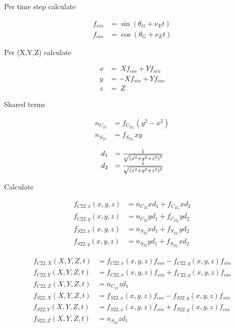 \documentclass{article}
\begin{document}
Per time step calculate

\begin{equation}
\begin{array}{ll}
f_{sin} &= \sin(\theta_G+\nu_Et) \\
f_{cos} &= \cos(\theta_G+\nu_Et)
\end{array}
\end{equation}

Per (X,Y,Z) calculate

\begin{equation}
\begin{array}{ll}
x&=~Xf_{cos}+Yf_{sin} \\
y&=-Xf_{sin}+Yf_{cos} \\
z&=~Z
\end{array}
\end{equation}

Shared terms

\begin{equation}
\begin{array}{ll}
n_{C_{22}} &= f_{C_{22_1}}(y^2-x^2) \\
n_{S_{22}} &= f_{S_{22_1}}xy
\end{array}
\end{equation}

\begin{equation}
\begin{array}{ll}
d_1 &= {1 \over \sqrt{(x^2+y^2+z^2)^7}} \\
d_2 &= {1 \over \sqrt{(x^2+y^2+z^2)^5}}
\end{array}
\end{equation}

Calculate

\begin{equation}
\begin{array}{ll}
f_{C22,x}(x,y,z) &= n_{C_{22}}xd_1 + f_{C_{22_2}}xd_2 \\
f_{C22,y}(x,y,z) &= n_{C_{22}}yd_1 + f_{C_{22_2}}yd_2 \\
f_{S22,x}(x,y,z) &= n_{S_{22}}xd_1 + f_{S_{22_2}}yd_2 \\
f_{S22,y}(x,y,z) &= n_{S_{22}}yd_1 + f_{S_{22_2}}xd_2
\end{array}
\end{equation}

\begin{equation}
\begin{array}{ll}
f_{C22,X}(X,Y,Z,t) &= f_{C22,x}(x,y,z)f_{cos} - f_{C22,y}(x,y,z)f_{sin} \\
f_{C22,Y}(X,Y,Z,t) &= f_{C22,x}(x,y,z)f_{sin} + f_{C22,y}(x,y,z)f_{cos} \\
f_{C22,Z}(X,Y,Z,t) &= n_{C_{22}}zd_1 \\
f_{S22,X}(X,Y,Z,t) &= f_{S22,x}(x,y,z)f_{cos} - f_{S22,y}(x,y,z)f_{sin} \\
f_{S22,Y}(X,Y,Z,t) &= f_{S22,x}(x,y,z)f_{sin} + f_{S22,y}(x,y,z)f_{cos} \\
f_{S22,Z}(X,Y,Z,t) &= n_{S_{22}}zd_1
\end{array}
\end{equation}
\end{document}
